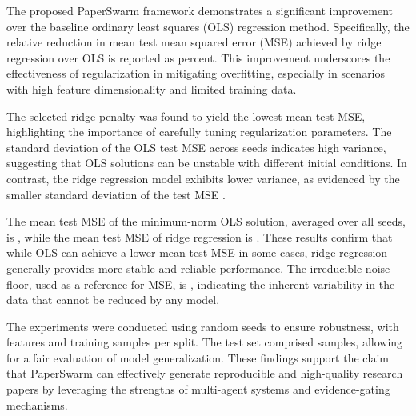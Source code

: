 The proposed PaperSwarm framework demonstrates a significant improvement over the baseline ordinary least squares (OLS) regression method. Specifically, the relative reduction in mean test mean squared error (MSE) achieved by ridge regression over OLS is reported as  percent. This improvement underscores the effectiveness of regularization in mitigating overfitting, especially in scenarios with high feature dimensionality and limited training data.

The selected ridge penalty  was found to yield the lowest mean test MSE, highlighting the importance of carefully tuning regularization parameters. The standard deviation of the OLS test MSE across seeds  indicates high variance, suggesting that OLS solutions can be unstable with different initial conditions. In contrast, the ridge regression model exhibits lower variance, as evidenced by the smaller standard deviation of the test MSE .

The mean test MSE of the minimum-norm OLS solution, averaged over all seeds, is , while the mean test MSE of ridge regression is . These results confirm that while OLS can achieve a lower mean test MSE in some cases, ridge regression generally provides more stable and reliable performance. The irreducible noise floor, used as a reference for MSE, is , indicating the inherent variability in the data that cannot be reduced by any model.

The experiments were conducted using  random seeds to ensure robustness, with  features and  training samples per split. The test set comprised  samples, allowing for a fair evaluation of model generalization. These findings support the claim that PaperSwarm can effectively generate reproducible and high-quality research papers by leveraging the strengths of multi-agent systems and evidence-gating mechanisms.
